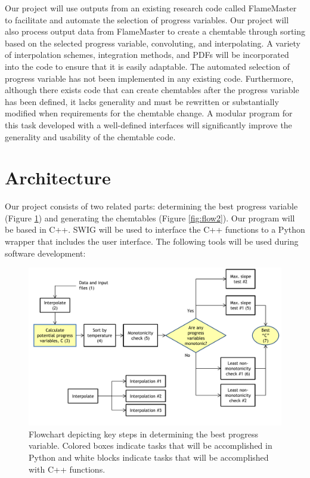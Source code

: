 \documentclass[11pt]{article}
\begin{document}
Our project will use outputs from an existing research code called FlameMaster to facilitate and automate the selection of progress variables. Our project will also process output data from FlameMaster to create a chemtable through sorting based on the selected progress variable, convoluting, and interpolating. A variety of interpolation schemes, integration methods, and PDFs will be incorporated into the code to ensure that it is easily adaptable. The automated selection of progress variable has not been implemented in any existing code. Furthermore, although there exists code that can create chemtables after the progress variable has been defined, it lacks generality and must be rewritten or substantially modified when requirements for the chemtable change. A modular program for this task developed with a well-defined interfaces will significantly improve the generality and usability of the chemtable code. 


\section{Architecture}
Our project consists of two related parts: determining the best progress variable (Figure \ref{fig:flow1}) and generating the chemtables (Figure \ref{fig:flow2}). Our program will be based in C++. SWIG will be used to interface the C++ functions to a Python wrapper that includes the user interface. The following tools will be used during software development:


\begin{figure}[h]
\centering
\includegraphics[width=\textwidth]{diagram_1_v4.pdf}
\caption{\label{fig:flow1}Flowchart depicting key steps in determining the best progress variable. Colored boxes indicate tasks that will be accomplished in Python and white blocks indicate tasks that will be accomplished with C++ functions.}
\end{figure}
\end{document}
